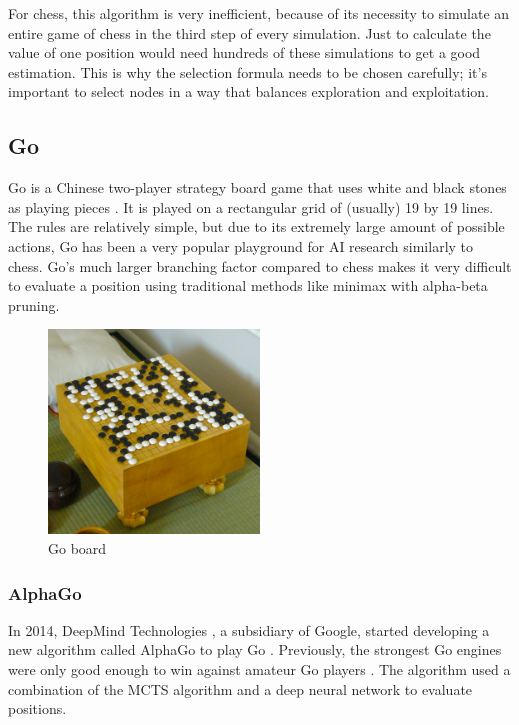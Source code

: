 \documentclass{article}
\begin{document}
For chess, this algorithm is very inefficient, because of its necessity to simulate 
an entire game of chess in the third step of every simulation. 
Just to calculate the value of one position would need hundreds of these simulations to get a good estimation.
This is why the selection formula needs to be chosen carefully; it's important to select nodes in a way that
balances exploration and exploitation.

\subsection{Go}

Go is a Chinese two-player strategy board game that uses white and black stones as playing pieces \cite{GoGame2022}.
It is played on a rectangular grid of (usually) 19 by 19 lines. The rules are relatively simple, but due to 
its extremely large amount of possible actions, Go has been a very popular playground for AI research similarly to chess.
Go's much larger branching factor compared to chess makes it very difficult to evaluate a position using 
traditional methods like minimax with alpha-beta pruning.

\begin{figure}[H]
    \centering
    \includegraphics[width=0.5\textwidth]{img/go.jpg}
    \caption{Go board \cite{GoGame2022}}
\end{figure}

\subsubsection{AlphaGo}

In 2014, DeepMind Technologies \cite{DeepMind2022}, a subsidiary of Google, 
started developing a new algorithm called AlphaGo to play Go \cite{AlphaGo2022a}. 
Previously, the strongest Go engines were only good enough to win against amateur Go players \cite{AlphaGo}.
The algorithm used a combination of the MCTS algorithm and a deep neural network to evaluate positions. 
\end{document}
